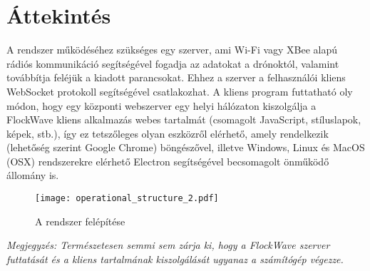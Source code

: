\section{Áttekintés}

A rendszer működéséhez szükséges egy szerver, ami Wi-Fi vagy XBee alapú rádiós
kommunikáció segítségével fogadja az adatokat a drónoktól, valamint továbbítja
feléjük a kiadott parancsokat. Ehhez a szerver a felhasználói kliens WebSocket
protokoll segítségével csatlakozhat. A kliens program futtatható oly módon, hogy
egy központi webszerver egy helyi hálózaton kiszolgálja a FlockWave kliens
alkalmazás webes tartalmát (csomagolt JavaScript, stíluslapok, képek, stb.), így
ez tetszőleges olyan eszközről elérhető, amely rendelkezik (lehetőség szerint
Google Chrome) böngészővel, illetve Windows, Linux és MacOS (OSX) rendszerekre
elérhető Electron segítségével becsomagolt önműködő állomány is.

\begin{figure}[H]
  \centering
    \texttt{[image: operational\_structure\_2.pdf]}
  \caption{A rendszer felépítése}
\end{figure}

\textit{Megjegyzés: Természetesen semmi sem zárja ki, hogy a FlockWave szerver
futtatását és a kliens tartalmának kiszolgálását ugyanaz a számítógép végezze.}
